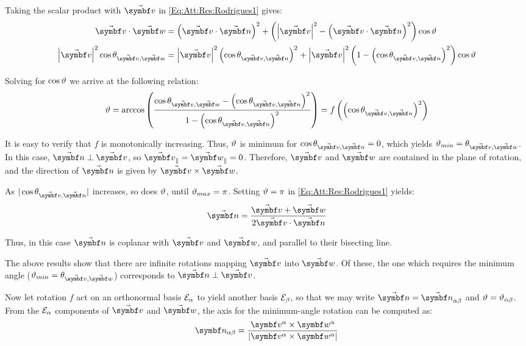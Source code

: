 Taking the scalar product with $\vabs{v}$ in \eqref{Eq:Att:Res:Rodrigues1} gives:
\begin{align*}
	\vabs{v} \cdot \vabs{w} &= \left( \vabs{v} \cdot \vabs{\rotax} \right)^{2} + \left( \norm{\vabs{v}}^{2} - \left( \vabs{v} \cdot \vabs{\rotax} \right)^{2} \right) \cos \rotang \\
	\norm{\vabs{v}}^{2} \cos \theta_{\vabs{v}, \vabs{w}} &= \norm{\vabs{v}}^{2} \left(\cos \theta_{\vabs{v},\vabs{\rotax}}\right)^{2} + \norm{\vabs{v}}^{2} \left( 1 - \left(\cos \theta_{\vabs{v},\vabs{\rotax}}\right)^{2} \right) \cos \rotang
\end{align*}

Solving for $\cos \rotang$ we arrive at the following relation:
\begin{equation}
	\rotang = \arccos \left( \frac{\cos \theta_{\vabs{v},\vabs{w}} - \left( \cos \theta_{\vabs{v},\vabs{\rotax}}\right)^{2}}{1 - \left(\cos \theta_{\vabs{v},\vabs{\rotax}}\right)^2 } \right)  = f\left( \left(\cos \theta_{\vabs{v},\vabs{\rotax}}\right)^2 \right)
\end{equation}

It is easy to verify that $f$ is monotonically increasing. Thus, $\rotang$ is minimum for $\cos \theta_{\vabs{v},\vabs{\rotax}} = 0$, which yields $\rotang_{min} = \theta_{\vabs{v},\vabs{w}}$. In this case, $\vabs{\rotax} \perp \vabs{v}$, so $\vasub{v}{\parallel} = \vasub{w}{\parallel} = 0$. Therefore, $\vabs{v}$ and $\vabs{w}$ are contained in the plane of rotation, and the direction of $\vabs{\rotax}$ is given by $\vabs{v} \times \vabs{w}$.

As $| \cos \theta_{\vabs{v},\vabs{\rotax}} |$ increases, so does $\rotang$, until $\rotang_{max} = \pi$. Setting $\rotang = \pi$ in \eqref{Eq:Att:Res:Rodrigues1} yields:
\begin{equation*}
	\vabs{\rotax} = \frac{\vabs{v} + \vabs{w} }{2 \vabs{v} \cdot \vabs{\rotax} }
\end{equation*}

Thus, in this case $\vabs{\rotax}$ is coplanar with $\vabs{v}$ and $\vabs{w}$, and parallel to their bisecting line.

The above results show that there are infinite rotations mapping $\vabs{v}$ into $\vabs{w}$. Of these, the one which requires the minimum angle ($\rotang_{min} = \theta_{\vabs{v},\vabs{w}}$) corresponds to $\vabs{\rotax} \perp \vabs{v}$.

Now let rotation $f$ act on an orthonormal basis $\basis[\alpha]$ to yield another basis $\basis[\beta]$, so that we may write $\vabs{\rotax} = \varel{\rotax}{\alpha}{\beta}$ and $\rotang = \rel{\rotang}{\alpha}{\beta}$. From the $\basis[\alpha]$ components of $\vabs{v}$ and $\vabs{w}$, the axis for the minimum-angle rotation can be computed as:
\begin{equation} \label{E:AttRep:Rodrigues:AxAlphaBetaAct}
	\vrel{\rotax}{\alpha}{\beta} = \frac{\vprj{v}{\alpha} \times \vprj{w}{\alpha}}{\norm{\vprj{v}{\alpha} \times \vprj{w}{\alpha}}}
\end{equation}

